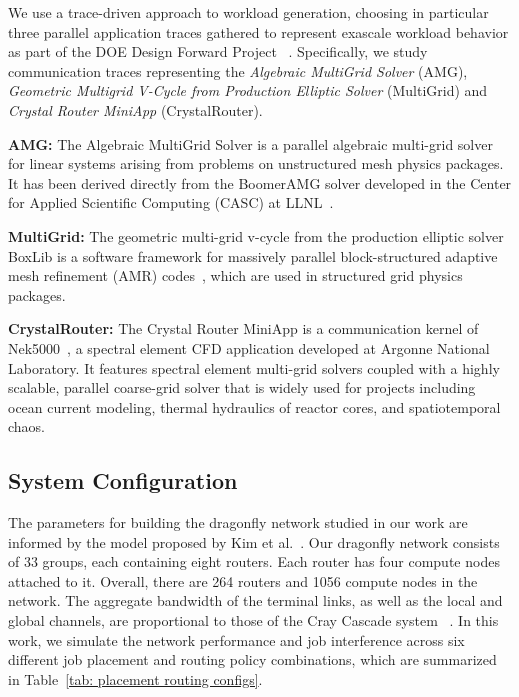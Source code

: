 We use a trace-driven approach to workload generation, choosing in particular three parallel application traces gathered to represent exascale workload behavior as part of the DOE Design Forward Project~\cite{designforwardwebpage} . Specifically, we study communication traces representing the \emph{Algebraic MultiGrid Solver} (AMG), \emph{Geometric Multigrid V-Cycle from Production Elliptic Solver} (MultiGrid) and \emph{Crystal Router MiniApp} (CrystalRouter).

\textbf{AMG:} The Algebraic MultiGrid Solver is a parallel algebraic multi-grid solver for linear systems arising from problems on unstructured mesh physics packages. It has been derived directly from the BoomerAMG solver developed in the Center for Applied Scientific Computing (CASC) at LLNL~\cite{amg}. 


\textbf{MultiGrid:} The geometric multi-grid v-cycle from the production elliptic solver BoxLib is a software framework for massively parallel block-structured adaptive mesh refinement (AMR) codes~\cite{boxlib}, which are used in structured grid physics packages. 

\textbf{CrystalRouter:} The Crystal Router MiniApp is a communication kernel of Nek5000~\cite{nek5000}, a spectral element CFD application developed at Argonne National Laboratory. It features spectral element multi-grid solvers coupled with a highly scalable, parallel coarse-grid solver that is widely used for projects including ocean current modeling, thermal hydraulics of reactor cores, and spatiotemporal chaos. 




\subsection{System Configuration}
\label{sec: simulation configuration}

The parameters for building the dragonfly network studied in our work are informed by the model proposed by Kim et al.~\cite{kim-micro}. Our dragonfly network consists of 33 groups, each containing eight routers. Each router has four compute nodes attached to it. Overall, there are 264 routers and 1056 compute nodes in the network.  The aggregate bandwidth of the terminal links, as well as the local and global channels, are proportional to those of the Cray Cascade system~\cite{faanes} . In this work, we simulate the network performance and job interference across six different job placement and routing policy combinations, which are summarized in Table~\ref{tab: placement routing configs}.

